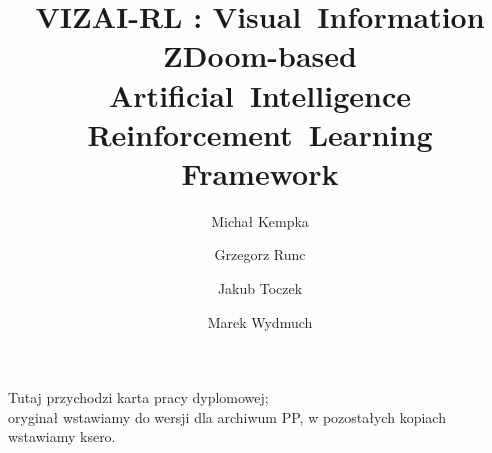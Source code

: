 \documentclass[english,bachelor,a4paper,twoside]{ppfcmthesis}
\author{%
   Michał Kempka \album{102030} \and 
   Grzegorz Runc \album{405060} \and 
   Jakub Toczek \album{708090} \and 
   Marek Wydmuch \album{807060}}
\title{VIZAI-RL : Visual~Information ZDoom-based Artificial~Intelligence Reinforcement~Learning Framework}        %
\begin{document}
\frontmatter\pagestyle{empty}%
\maketitle\cleardoublepage%

\thispagestyle{empty}\vspace*{\fill}%
\begin{center}Tutaj przychodzi karta pracy dyplomowej;\\oryginał wstawiamy do wersji dla archiwum PP, w pozostałych kopiach wstawiamy ksero.\end{center}%
\vfill\cleardoublepage%


\cleardoublepage

\pagestyle{ppfcmthesis}%
\tableofcontents* \cleardoublepage%

\mainmatter%






{\raggedright\sloppy\small}

\cleardoublepage\appendix%


\ppcolophon
\end{document}
